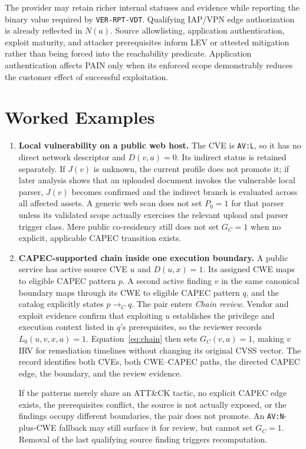 \documentclass[11pt]{article}
\newcommand{\code}[1]{\texttt{#1}}
\begin{document}
The provider may retain richer internal statuses and evidence while reporting
the binary value required by \code{VER-RPT-VDT}. Qualifying IAP/VPN edge
authorization is already reflected in $N(a)$. Source allowlisting, application
authentication, exploit maturity, and attacker prerequisites inform LEV or
attested mitigation rather than being forced into the reachability predicate.
Application authentication affects PAIN only when its enforced scope
demonstrably reduces the customer effect of successful exploitation.

\section{Worked Examples}
\label{sec:examples}
\begin{enumerate}[leftmargin=1.8em]
\item \textbf{Local vulnerability on a public web host.}
The CVE is \code{AV:L}, so it has no direct network descriptor and
$D(v,a)=0$. Its indirect status is retained separately. If $J(v)$ is unknown,
the current profile does not promote it; if later analysis shows that an
uploaded document invokes the vulnerable local parser, $J(v)$ becomes
confirmed and the indirect branch is evaluated across all affected assets. A
generic web scan does not set $P_0=1$ for that parser unless its validated scope
actually exercises the relevant upload and parser trigger class. Mere public
co-residency still does not set $G_C=1$ when no explicit, applicable CAPEC
transition exists.

\item \textbf{CAPEC-supported chain inside one execution boundary.}
A public service has active source CVE $u$ and $D(u,x)=1$. Its assigned CWE
maps to eligible CAPEC pattern $p$. A second active finding $v$ in the same
canonical boundary maps through its CWE to eligible CAPEC pattern $q$, and the
catalog explicitly states $p\rightarrow_C q$. The pair enters \emph{Chain
review}. Vendor and exploit evidence confirm that exploiting $u$ establishes
the privilege and execution context listed in $q$'s prerequisites, so the
reviewer records $L_0(u,v,x,a)=1$. Equation~\ref{eq:chain} then sets
$G_C(v,a)=1$, making $v$ IRV for remediation timelines without changing its
original CVSS vector. The record identifies both CVEs, both CWE--CAPEC paths,
the directed CAPEC edge, the boundary, and the review evidence.

If the patterns merely share an ATT\&CK tactic, no explicit CAPEC edge exists,
the prerequisites conflict, the source is not actually exposed, or the
findings occupy different boundaries, the pair does not promote. An
\code{AV:N}-plus-CWE fallback may still surface it for review, but cannot set
$G_C=1$. Removal of the last qualifying source finding triggers recomputation.


\end{enumerate}
\end{document}

